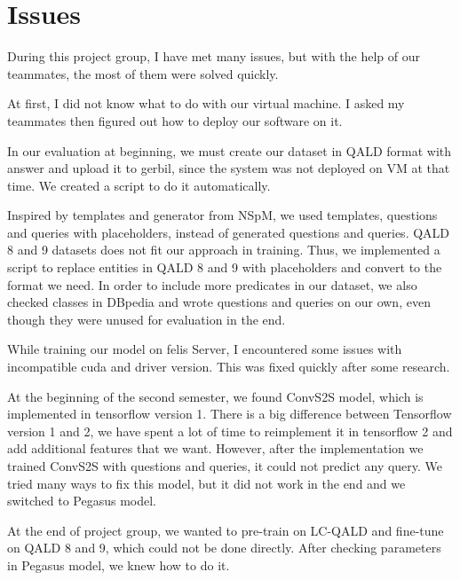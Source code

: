 
\section{Issues}

During this project group,
I have met many issues, 
but with the help of our teammates, 
the most of them were solved quickly.

At first, I did not know what to do with our virtual machine. 
I asked my teammates then figured out how to deploy our software on it. 

In our evaluation at beginning, 
we must create our dataset in QALD format with answer
and upload it to gerbil,
since the system was not deployed on VM at that time. 
We created a script to do it automatically. 

Inspired by templates and generator from NSpM,
we used templates, questions and queries with placeholders, 
instead of generated questions and queries.
QALD 8 and 9 datasets does not fit our approach in training. 
Thus, we implemented a script to replace entities in QALD 8 and 9 with placeholders
and convert to the format we need. 
In order to include more predicates in our dataset, 
we also checked classes in DBpedia 
and wrote questions and queries on our own,
even though they were unused for evaluation in the end. 

While training our model on felis Server, 
I encountered some issues with incompatible cuda and driver version. 
This was fixed quickly after some research. 

At the beginning of the second semester,
we found ConvS2S model,
which is implemented in tensorflow version 1. 
There is a big difference between Tensorflow version 1 and 2,
we have spent a lot of time to reimplement it in tensorflow 2
and add additional features that we want.
However, after the implementation we trained ConvS2S with questions and queries,
it could not predict any query. 
We tried many ways to fix this model, 
but it did not work in the end
and we switched to Pegasus model. 

At the end of project group, 
we wanted to pre-train on LC-QALD and fine-tune on QALD 8 and 9,
which could not be done directly. 
After checking parameters in Pegasus model, 
we knew how to do it. 